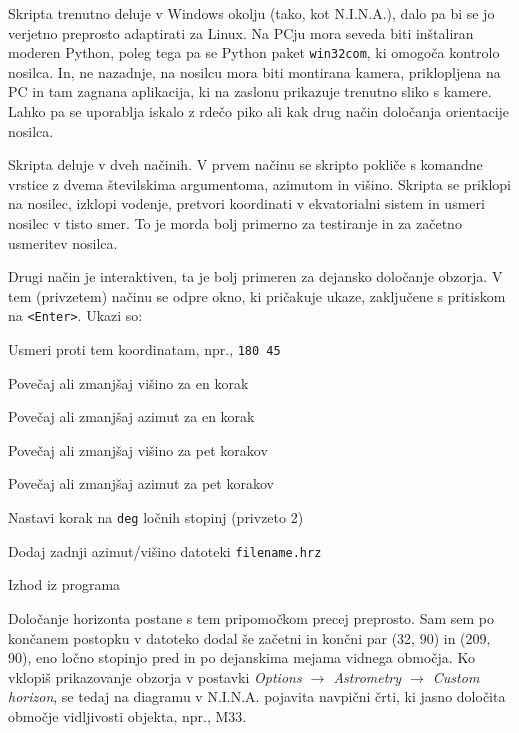 \documentclass[11pt]{article}
\makeatletter
\newcommand{\nina}{N.I.N.A.\@\xspace}
\makeatother
\begin{document}
Skripta trenutno deluje v Windows okolju (tako, kot \nina), dalo pa bi se jo verjetno preprosto adaptirati za Linux. Na PCju mora seveda biti inštaliran moderen Python, poleg tega pa se Python paket \texttt{win32com}, ki omogoča kontrolo nosilca. In, ne nazadnje, na nosilcu mora biti montirana kamera, priklopljena na PC in tam zagnana aplikacija, ki na zaslonu prikazuje trenutno sliko s kamere. Lahko pa se uporablja iskalo z rdečo piko ali kak drug način določanja orientacije nosilca.

Skripta deluje v dveh načinih. V prvem načinu se skripto pokliče s komandne vrstice z dvema številskima argumentoma, azimutom in višino. Skripta se priklopi na nosilec, izklopi vodenje, pretvori koordinati v ekvatorialni sistem in usmeri nosilec v tisto smer. To je morda bolj primerno za testiranje in za začetno usmeritev nosilca.

Drugi način je interaktiven, ta je bolj primeren za dejansko določanje obzorja. V tem (privzetem) načinu se odpre okno, ki pričakuje ukaze, zaključene s pritiskom na \texttt{<Enter>}. Ukazi so:

\begin{description}[itemsep=0pt, labelindent=1em]
	\item[$<$alt$>$ $<$az$>$:] Usmeri proti tem koordinatam, npr., \texttt{180 45}
	\item[u/d:] Povečaj ali zmanjšaj višino za en korak
	\item[l/r:] Povečaj ali zmanjšaj azimut za en korak
	\item[U/D:] Povečaj ali zmanjšaj višino za pet korakov
    \item[L/R:] Povečaj ali zmanjšaj azimut za pet korakov
    \item[step $<$deg$>$:] Nastavi korak na \texttt{deg} ločnih stopinj (privzeto 2)
    \item[$<$filename$>$:] Dodaj zadnji azimut/višino datoteki \texttt{filename.hrz}
    \item[q/quit:] Izhod iz programa
\end{description}

Določanje horizonta postane s tem pripomočkom precej preprosto. Sam sem po končanem postopku v datoteko dodal še začetni in končni par (32, 90) in (209, 90), eno ločno stopinjo pred in po dejanskima mejama vidnega območja. Ko vklopiš prikazovanje obzorja v postavki {\em Options $\rightarrow$ Astrometry $\rightarrow$ Custom horizon}, se tedaj na diagramu v \nina pojavita navpični črti, ki jasno določita območje vidljivosti objekta, npr., M33.
\end{document}

